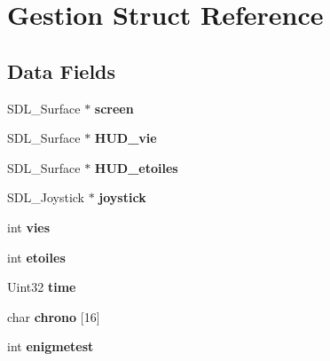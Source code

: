 \hypertarget{structGestion}{}\section{Gestion Struct Reference}
\label{structGestion}
\subsection*{Data Fields}
\begin{DoxyCompactItemize}
\item 
\mbox{\label{structGestion_a6010de7d100c2fde67ca62ecae10c514}} 
S\+D\+L\+\_\+\+Surface $\ast$ {\bfseries screen}
\item 
\mbox{\label{structGestion_a42444aec400fb97154b1d2de18de3a34}} 
S\+D\+L\+\_\+\+Surface $\ast$ {\bfseries H\+U\+D\+\_\+vie}
\item 
\mbox{\label{structGestion_ae1642eab04889a16e6b21ac714390fc7}} 
S\+D\+L\+\_\+\+Surface $\ast$ {\bfseries H\+U\+D\+\_\+etoiles}
\item 
\mbox{\label{structGestion_ac8bbd81564508dba6131a3652ea1ed42}} 
S\+D\+L\+\_\+\+Joystick $\ast$ {\bfseries joystick}
\item 
\mbox{\label{structGestion_afe785328e233dc47ed02300398ebaee2}} 
int {\bfseries vies}
\item 
\mbox{\label{structGestion_adde1bd3b7090a4dd9f068255a01c37f0}} 
int {\bfseries etoiles}
\item 
\mbox{\label{structGestion_acdebd98abd999e7a5678bf5f6d51d8bc}} 
Uint32 {\bfseries time}
\item 
\mbox{\label{structGestion_af5552b11d4f187162330c5c5f9e3341c}} 
char {\bfseries chrono} \mbox{[}16\mbox{]}
\item 
\mbox{\label{structGestion_ad6a863b78c30bb1f3b6a5bf88647979a}} 
int {\bfseries enigmetest}
\item 
\mbox{\label{structGestion_a92738133a0021360f0c2371d071bd907}} 

\end{DoxyCompactItemize}
